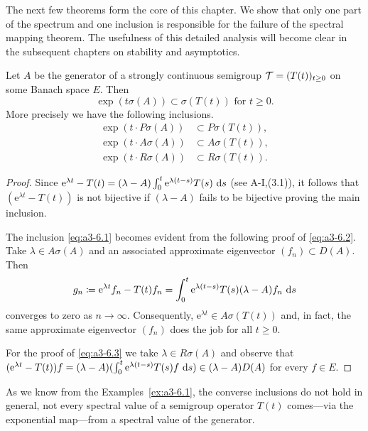 The next few theorems form the core of this chapter. 
We show that only one part of the spectrum and one inclusion is responsible for the failure of the spectral mapping theorem.
The usefulness of this detailed analysis will become clear in the subsequent chapters on stability and asymptotics.
\begin{proposition}
\label{prop:a3-6.2}
	
Let $A$ be the generator of a strongly continuous semigroup $\mathcal{T} = (T(t))_{t \geq 0}$ on some Banach space $E$.
Then
\[
\exp(t\sigma(A)) \subset \sigma(T(t)) \text{ for } t \geq 0 .
\]
More precisely we have the following inclusions.
\begin{align}
\exp(t \cdot P\sigma(A)) &\subset P\sigma(T(t)) \label{eq:a3-6.1} , \\
\exp(t \cdot A\sigma(A)) &\subset A\sigma(T(t)) \label{eq:a3-6.2} , \\
\exp(t \cdot R\sigma(A)) &\subset R\sigma(T(t)) \label{eq:a3-6.3} .
\end{align}
\end{proposition}
\begin{proof}
Since $\mathrm{e}^{\lambda t} - T(t) = (\lambda - A)\int_{0}^{t} \mathrm{e}^{\lambda(t-s)}T(s) \, \mathop{}\!\mathrm{d}{s}$ (see A-I,(3.1)), it follows that $(\mathrm{e}^{\lambda t} - T(t))$ is not bijective if $(\lambda - A)$ fails to be bijective proving the main inclusion.

The inclusion \eqref{eq:a3-6.1} becomes evident from the following proof of \eqref{eq:a3-6.2}. Take $\lambda \in A\sigma(A)$ and an associated approximate eigenvector $(f_{n}) \subset D(A)$.
Then
\[
g_{n} \coloneqq \mathrm{e}^{\lambda t}f_{n} - T(t)f_{n} = \int_{0}^{t} \mathrm{e}^{\lambda(t-s)}T(s)(\lambda-A)f_{n} \, \mathop{}\!\mathrm{d}{s}
\]
converges to zero as $n \to \infty$.
Consequently, $\mathrm{e}^{\lambda t} \in A\sigma(T(t))$ and, in fact, the same approximate eigenvector $(f_{n})$ does the job for all $t \geq 0$.

For the proof of \eqref{eq:a3-6.3} we take $\lambda \in R\sigma(A)$ and observe that $(\mathrm{e}^{\lambda t} - T(t))f = (\lambda - A)(\int_{0}^{t} \mathrm{e}^{\lambda(t-s)}T(s)f \, \mathop{}\!\mathrm{d}{s}) \in (\lambda - A)D(A)$ for every $f \in E$.
\end{proof}
As we know from the Examples~\ref{ex:a3-6.1}, the converse inclusions do not hold in general, \ie not every spectral value of a semigroup operator $T(t)$ comes---via the exponential map---from a spectral value of the generator.
